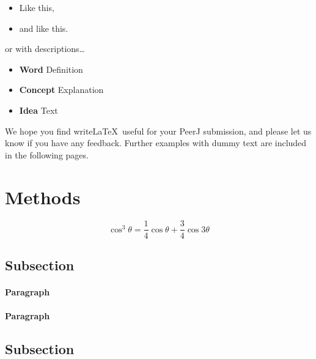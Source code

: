 \documentclass[fleqn,10pt,lineno]{wlpeerj} %
\providecommand{\tightlist}{
\setlength{\itemsep}{0pt}\setlength{\parskip}{0pt}}
\theoremstyle{definition}
\theoremstyle{definition}
\theoremstyle{definition}
\theoremstyle{remark}
\begin{document}
\begin{itemize}
\tightlist
\item
  Like this,
\item
  and like this.
\end{itemize}

or with descriptions\ldots{}

\begin{itemize}
\tightlist
\item
  \textbf{Word} Definition
\item
  \textbf{Concept} Explanation
\item
  \textbf{Idea} Text
\end{itemize}

We hope you find write\LaTeX~useful for your PeerJ submission, and
please let us know if you have any feedback. Further examples with dummy
text are included in the following pages.

\section*{Methods}\label{methods}

\lipsum[4] 

\begin{equation}
\cos^3 \theta =\frac{1}{4}\cos\theta+\frac{3}{4}\cos 3\theta
\label{eq:refname2}
\end{equation}

\lipsum[5] 

\subsection*{Subsection}\label{subsection}

\lipsum[6] 

\paragraph{Paragraph}

\lipsum[7]  \paragraph{Paragraph} \lipsum[8] 

\subsection*{Subsection}\label{subsection-1}
\end{document}
